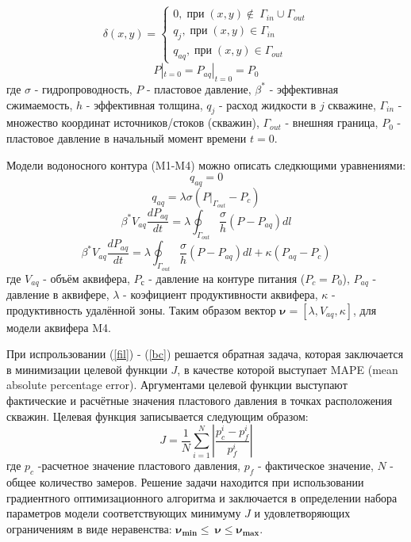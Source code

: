 \documentclass{article}
\begin{document}
\begin{equation} \label{bc}
\delta(x,y)  = \left\{\begin{array}{crl}
0, \;при\;(x,y) \notin\ \Gamma_{in}\cup\Gamma_{out}\\
q_j, \;при\;(x,y) \in \Gamma_{in}\\
q_{aq}, \;при\;(x,y) \in \Gamma_{out}
\end{array}\right.
\end{equation}
\begin{equation*}
P|_{t=0} = P_{aq}|_{t=0} = P_0
\end{equation*}
где $\sigma$ - гидропроводность, $P$ - пластовое давление, $\beta^*$ - эффективная сжимаемость, $h$ - эффективная толщина, $q_j$ - расход жидкости в $j$ скважине, $\Gamma_{in}$ - множество координат источников/стоков (скважин), $\Gamma_{out}$ - внешняя граница, $P_0$ - пластовое давление в начальный момент времени $t=0$.

Модели водоносного контура (M1-M4) можно описать следкющими уравнениями:
\begin{equation}
q_{aq}=0
\end{equation}
\begin{equation}
q_{aq} = \lambda\sigma(P|_{\Gamma_{out}}-P_c)
\end{equation}
\begin{equation}
\beta^*V_{aq}\frac{dP_{aq}}{dt} = \lambda\oint_{\Gamma_{out}}\frac{\sigma}{h}(P-P_{aq})dl
\end{equation}
\begin{equation}
\beta^*V_{aq}\frac{dP_{aq}}{dt} =\lambda\oint_{\Gamma_{out}}\frac{\sigma}{h}(P-P_{aq})dl + \kappa(P_{aq}-P_c)
\end{equation}
где $V_{aq}$ - объём аквифера, $P_с$ - давление на контуре питания ($P_c = P_0$), $P_{aq}$ - давление в аквифере, $\lambda$ - коэфициент продуктивности аквифера, $\kappa$ - продуктивность удалённой зоны. Таким образом вектор $\boldsymbol{\nu} = [\lambda, V_{aq}, \kappa]$, для модели аквифера M4.

При испрользовании (\ref{fil}) - (\ref{bc}) решается обратная задача, которая заключается в  минимизации целевой функции $J$, в качестве которой выступает MAPE (mean absolute percentage error). Аргументами целевой функции выступают фактические и расчётные значения пластового давления в точках расположения скважин. Целевая функция записывается следующим образом:
\begin{equation} \label{mape}
J=\frac{1}{N}\sum_{i=1}^N{\left\vert\frac{p_c^i-p_f^i}{p_f^i}\right\vert}
\end{equation}
где $p_c$ -расчетное значение пластового давления, $p_f$ - фактическое значение, $N$ - общее количество замеров. Решение задачи находится при использовании градиентного оптимизационного алгоритма и заключается в определении набора параметров модели соответствующих минимуму $J$ и удовлетворяющих ограничениям в виде неравенства: $\boldsymbol{\nu_{min}}\leq\ \boldsymbol{\nu}\leq\boldsymbol{\nu_{max}}$.
\end{document}
